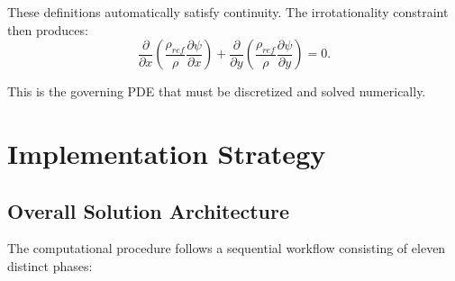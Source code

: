 These definitions automatically satisfy continuity. The irrotationality constraint then produces:
\begin{equation}
\frac{\partial}{\partial x}\left(\frac{\rho_{ref}}{\rho} \frac{\partial \psi}{\partial x}\right) + \frac{\partial}{\partial y}\left(\frac{\rho_{ref}}{\rho} \frac{\partial \psi}{\partial y}\right) = 0.
\end{equation}

This is the governing PDE that must be discretized and solved numerically.

\section{Implementation Strategy}

\subsection{Overall Solution Architecture}

The computational procedure follows a sequential workflow consisting of eleven distinct phases:

